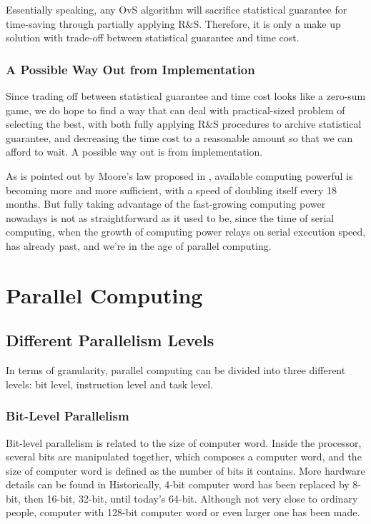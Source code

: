 \documentclass[12pt,a4paper]{report}
\begin{document}
Essentially speaking, any OvS algorithm will sacrifice statistical guarantee for time-saving through partially applying R\&S. Therefore, it is only a make up solution with trade-off between statistical guarantee and time cost.

\subsection{A Possible Way Out from Implementation}

Since trading off between statistical guarantee and time cost looks like a zero-sum game, we do hope to find a way that can deal with practical-sized problem of selecting the best, with both fully applying R\&S procedures to archive statistical guarantee, and decreasing the time cost to a reasonable amount so that we can afford to wait. A possible way out is from implementation.

As is pointed out by Moore's law proposed in \cite{moore}, available computing powerful is becoming more and more sufficient, with a speed of doubling itself every 18 months. But fully taking advantage of the fast-growing computing power nowadays is not as straightforward as it used to be, since the time of serial computing, when the growth of computing power relays on serial execution speed, has already past, and we're in the age of parallel computing.

\chapter{Parallel Computing}

\section{Different Parallelism Levels}

In terms of granularity, parallel computing can be divided into three different levels: bit level, instruction level and task level.

\subsection{Bit-Level Parallelism}

Bit-level parallelism is related to the size of computer word. Inside the processor, several bits are manipulated together, which composes a computer word, and the size of computer word is defined as the number of bits it contains. More hardware details can be found in \cite{pca97} Historically, 4-bit computer word has been replaced by 8-bit, then 16-bit, 32-bit, until today's 64-bit. Although not very close to ordinary people, computer with 128-bit computer word or even larger one has been made.
\end{document}
